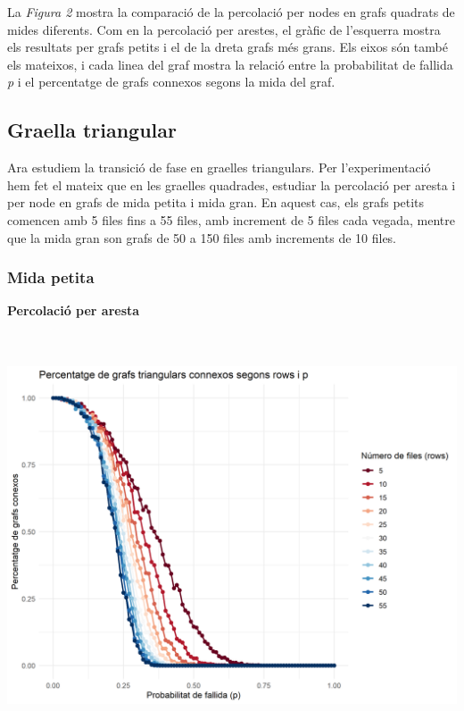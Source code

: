 \documentclass[a4paper]{article}
\begin{document}
	La \textit{Figura 2} mostra la comparació de la percolació per nodes en grafs quadrats de mides diferents. Com en la percolació per arestes, el gràfic de l'esquerra mostra els resultats per grafs petits i el de la dreta grafs més grans. Els eixos són també els mateixos, i cada linea del graf mostra la relació entre la probabilitat de fallida \textit{p} i el percentatge de grafs connexos segons la mida del graf.
	
	\subsection{Graella triangular}
	
	Ara estudiem la transició de fase en graelles triangulars. Per l'experimentació hem fet el mateix que en les graelles quadrades, estudiar la percolació per aresta i per node en grafs de mida petita i mida gran. En aquest cas, els grafs petits comencen amb 5 files fins a 55 files, amb increment de 5 files cada vegada, mentre que la mida gran son grafs de 50 a 150 files amb increments de 10 files.
	
	
	\subsubsection{Mida petita}
	
	\textbf{Percolació per aresta}
	
	
	\includegraphics[height=12cm]{images/triangularE-5-55-1000}
	
\end{document}
